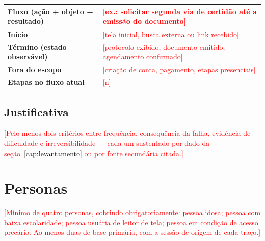 \documentclass[
  12pt,
  oneside,
  a4paper,
  chapter=TITLE,
  section=TITLE,
  english,
  brazil
]{abntex2}
\newcommand{\preencher}[1]{\textcolor{red}{[#1]}}
\begin{document}
\begin{quadro}[htbp]
  \caption{Delimitação do fluxo crítico}\label{qua:fluxo}
  \centering\small
  \begin{tabularx}{\textwidth}{|l|X|}\hline
    \textbf{Fluxo (ação + objeto + resultado)} & \preencher{ex.: solicitar segunda via de certidão até a emissão do documento} \\\hline
    \textbf{Início}            & \preencher{tela inicial, busca externa ou link recebido} \\\hline
    \textbf{Término (estado observável)} & \preencher{protocolo exibido, documento emitido, agendamento confirmado} \\\hline
    \textbf{Fora do escopo}    & \preencher{criação de conta, pagamento, etapas presenciais} \\\hline
    \textbf{Etapas no fluxo atual} & \preencher{n} \\\hline
  \end{tabularx}
\end{quadro}

\section{Justificativa}

\preencher{Pelo menos dois critérios entre frequência, consequência da falha,
evidência de dificuldade e irreversibilidade --- cada um sustentado por dado da
seção~\ref{cap:levantamento} ou por fonte secundária citada.}

\chapter{Personas}\label{cap:personas}

\preencher{Mínimo de quatro personas, cobrindo obrigatoriamente: pessoa idosa;
pessoa com baixa escolaridade; pessoa usuária de leitor de tela; pessoa em
condição de acesso precário. Ao menos duas de base primária, com a sessão de
origem de cada traço.}
\end{document}
